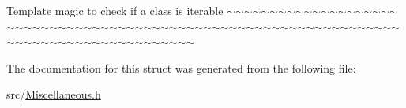  Template magic to check if a class is iterable $\sim$$\sim$$\sim$$\sim$$\sim$$\sim$$\sim$$\sim$$\sim$$\sim$$\sim$$\sim$$\sim$$\sim$$\sim$$\sim$$\sim$$\sim$$\sim$$\sim$$\sim$$\sim$$\sim$$\sim$$\sim$$\sim$$\sim$$\sim$$\sim$$\sim$$\sim$$\sim$$\sim$$\sim$$\sim$$\sim$$\sim$$\sim$$\sim$$\sim$$\sim$$\sim$$\sim$$\sim$$\sim$$\sim$$\sim$$\sim$$\sim$$\sim$$\sim$$\sim$$\sim$$\sim$$\sim$$\sim$$\sim$$\sim$$\sim$$\sim$$\sim$$\sim$$\sim$$\sim$$\sim$$\sim$$\sim$$\sim$$\sim$$\sim$$\sim$$\sim$$\sim$$\sim$$\sim$$\sim$$\sim$$\sim$$\sim$$\sim$$\sim$$\sim$$\sim$$\sim$$\sim$$\sim$$\sim$$\sim$ 

The documentation for this struct was generated from the following file\+:\begin{DoxyCompactItemize}
\item 
src/\hyperlink{_miscellaneous_8h}{Miscellaneous.\+h}\end{DoxyCompactItemize}
